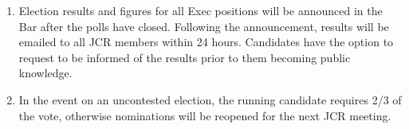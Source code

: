 \begin{enumerate}
\begin{enumerate}
        \label{it:Reopen Election}
        \item Election results and figures for all Exec positions will be announced in the Bar after the polls have closed. Following the announcement, results will be emailed to all JCR members within 24 hours. Candidates have the option to request to be informed of the results prior to them becoming public knowledge.
        \item In the event on an uncontested election, the running candidate requires 2/3 of the vote, otherwise nominations will be reopened for the next JCR meeting.
    \end{enumerate}
\end{enumerate}

\label{Election Schedule}
